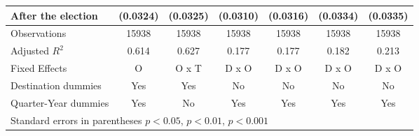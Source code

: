 \begin{table}[htbp]
\begin{tabular}{l*{6}{c}}
 After the election                    &    (0.0324)         &    (0.0325)         &    (0.0310)         &    (0.0316)         &    (0.0334)         &    (0.0335)         \\
\hline
Observations        &       15938         &       15938         &       15938         &       15938         &       15938         &       15938         \\
Adjusted \(R^{2}\)  &       0.614         &       0.627         &       0.177         &       0.177         &       0.182         &       0.213         \\
Fixed Effects       &           O         &       O x T         &       D x O         &       D x O         &       D x O         &       D x O         \\
Destination dummies &         Yes         &         Yes         &          No         &          No         &          No         &          No         \\
Quarter-Year dummies&         Yes         &          No         &         Yes         &         Yes         &         Yes         &         Yes         \\
\hline\hline
\multicolumn{7}{l}{Standard errors in parentheses \sym{*} \(p<0.05\), \sym{**} \(p<0.01\), \sym{***} \(p<0.001\)}\\
\end{tabular}
\end{table}
